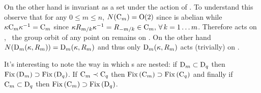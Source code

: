 \begin{example}
On the other hand  is invariant as a set under the action of .
To understand this observe that for any $0\le m\le n$, $N(\mathrm{C}_{m})=\mathrm{O}(2)$
since  is abelian while $\kappa \mathrm{C}_{m} \kappa^{-1} = \mathrm{C}_{m}$ since $\kappa R_{m/k}\kappa^{-1}=R_{-m/k}\in\mathrm{C}_{m},\, \forall\, k=1\ldots m$. Therefore  acts on , \ie\ the group orbit of any point on  remains on .
On the other hand $N(\mathrm{D}_{m}(\kappa,R_{m}))=\mathrm{D}_{m}(\kappa,R_{m})$ and thus only $\mathrm{D}_{m}(\kappa,R_{m})$ acts (trivially) on .

It's interesting to note the way in which \fixedsp s are nested: if $\mathrm{D}_{m}\subset\mathrm{D}_{q}$ then $\mathrm{Fix}\left(\mathrm{D}_{m}\right)\supset\mathrm{Fix}\left(\mathrm{D}_{q}\right)$. If $\mathrm{C}_{m}\prec\mathrm{C}_{q}$ then $\mathrm{Fix}\left(\mathrm{C}_{m}\right)\supset\mathrm{Fix}\left(\mathrm{C}_{q}\right)$ and
finally if $\mathrm{C}_{m}\subset\mathrm{D}_{q}$ then $\mathrm{Fix}\left(\mathrm{C}_{m}\right)\supset\mathrm{Fix}\left(\mathrm{D}_{q}\right)$.



\end{example}
